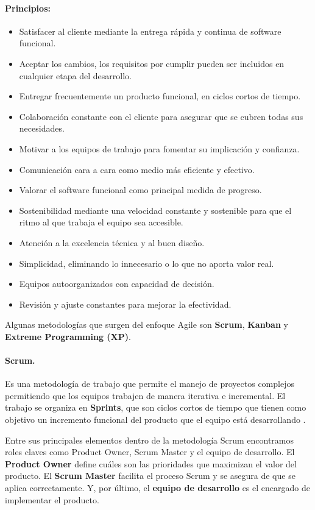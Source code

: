 \paragraph{Principios:}
\begin{itemize}
    \item Satisfacer al cliente mediante la entrega rápida y continua de software funcional.
    \item Aceptar los cambios, los requisitos por cumplir pueden ser incluidos en cualquier etapa del desarrollo.
    \item Entregar frecuentemente un producto funcional, en ciclos cortos de tiempo.
    \item Colaboración constante con el cliente para asegurar que se cubren todas sus necesidades.
    \item Motivar a los equipos de trabajo para fomentar su implicación y confianza.
    \item Comunicación cara a cara como medio más eficiente y efectivo.
    \item Valorar el software funcional como principal medida de progreso.
    \item Sostenibilidad mediante una velocidad constante y sostenible para que el ritmo al que trabaja el equipo sea accesible.
    \item Atención a la excelencia técnica y al buen diseño.
    \item Simplicidad, eliminando lo innecesario o lo que no aporta valor real.
    \item Equipos autoorganizados con capacidad de decisión.
    \item Revisión y ajuste constantes para mejorar la efectividad.
\end{itemize}

Algunas metodologías que surgen del enfoque Agile son \textbf{Scrum}, \textbf{Kanban} y \textbf{Extreme Programming (XP)}.

\paragraph{Scrum.} Es una metodología de trabajo que permite el manejo de proyectos complejos permitiendo que los equipos trabajen de manera iterativa e incremental. El trabajo se organiza en \textbf{Sprints}, que son ciclos cortos de tiempo que tienen como objetivo un incremento funcional del producto que el equipo está desarrollando \cite{scrum}.

Entre sus principales elementos dentro de la metodología Scrum encontramos roles claves como Product Owner, Scrum Master y el equipo de desarrollo. El \textbf{Product Owner} define cuáles son las prioridades que maximizan el valor del producto. El \textbf{Scrum Master} facilita el proceso Scrum y se asegura de que se aplica correctamente. Y, por último, el \textbf{equipo de desarrollo} es el encargado de implementar el producto.

